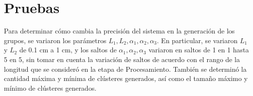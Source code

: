 \section{Pruebas}

Para determinar cómo cambia la precisión del sistema en la generación de los grupos, se variaron los parámetros $L_1, L_2, \alpha_1, \alpha_2, \alpha_3$. En particular, se variaron $L_1$ y $L_2$ de 0.1 cm a 1 cm, y los saltos de $\alpha_1, \alpha_2, \alpha_3$ variaron en saltos de 1 en 1 hasta 5 en 5, sin tomar en cuenta la variación de saltos de acuerdo con el rango de la longitud que se consideró en la etapa de Procesamiento. También se determinó la cantidad máxima y mínima de clústeres generados, así como el tamaño máximo y mínimo de clústeres generados.